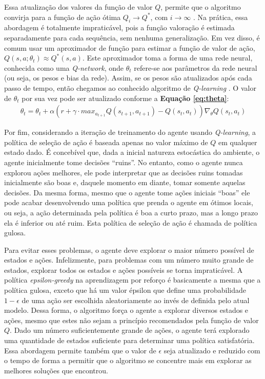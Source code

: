 Essa atualização dos valores da função de valor $Q$, permite que o algoritmo convirja para a função de ação ótima $Q_i \rightarrow Q^*$, com $i\rightarrow\infty$ \cite{sutton-barto-rl-intro}. Na prática, essa abordagem é totalmente impraticável, pois a função valoração é estimada separadamente para cada sequência, sem nenhuma generalização. Em vez disso, é comum usar um aproximador de função para estimar a função de valor de ação, $Q(s,a;\theta_t) \approx Q^*(s,a)$. Este aproximador toma a forma de uma rede neural, conhecida como uma \textit{Q-network}, onde $\theta_t$ refere-se aos parâmetros da rede neural (ou seja, os pesos e bias da rede). Assim, se os pesos são atualizados após cada passo de tempo, então chegamos ao conhecido algoritmo de \textit{Q-learning} \cite{Watkins-Dayan-Qlearning}. O valor de $\theta_t$ por sua vez pode ser atualizado conforme a \textbf{Equação \ref{eq:theta}}:
\begin{eqnarray}
  \theta_t = \theta_t + \alpha(r + \gamma\cdot max_{a_{t+1}}Q(s_{t+1},a_{t+1}) - Q(s_t,a_t))\nabla_\theta Q(s_t,a_t)
  \label{eq:theta}
\end{eqnarray}

Por fim, considerando a iteração de treinamento do agente usando \textit{Q-learning}, a política de seleção de ação é baseada apenas no valor máximo de $Q$ em qualquer estado dado. É concebível que, dada a inicial natureza estocástica do ambiente, o agente inicialmente tome decisões “ruins”. No entanto, como o agente nunca explorou ações melhores, ele pode interpretar que as decisões ruins tomadas inicialmente são boas e, daquele momento em diante, tomar somente aquelas decisões. Da mesma forma, mesmo que o agente tome ações iniciais ``boas'' ele pode acabar desenvolvendo uma política que prenda o agente em ótimos locais, ou seja, a ação determinada pela política é boa a curto prazo, mas a longo prazo ela é inferior ou até ruim. Esta política de seleção de ação é chamada de política gulosa.

Para evitar esses problemas, o agente deve explorar o maior número possível de estados e ações. Infelizmente, para problemas com um número muito grande de estados, explorar todos os estados e ações possíveis se torna impraticável. A política \textit{epsilon-greedy} na aprendizagem por reforço é basicamente a mesma que a política gulosa, exceto que há um valor épsilon que define uma probabilidade $1-\epsilon$ de uma ação ser escolhida aleatoriamente ao invés de definida pelo atual modelo. Dessa forma, o algoritmo força o agente a explorar diversos estados e ações, mesmo que estes não sejam a princípio recomendados pela função de valor $Q$. Dado um número suficientemente grande de ações, o agente terá explorado uma quantidade de estados suficiente para determinar uma política satisfatória. Essa abordagem permite também que o valor de $\epsilon$ seja atualizado e reduzido com o tempo de forma a permitir que o algoritmo se concentre mais em explorar as melhores soluções que encontrou. 

